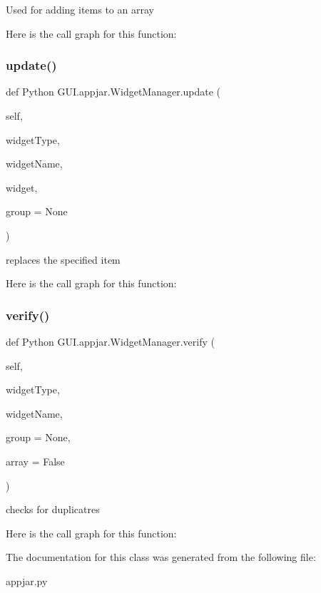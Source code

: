 \begin{DoxyVerb}Used for adding items to an array \end{DoxyVerb}
 Here is the call graph for this function\+:
\mbox{\label{class_python_01_g_u_i_1_1appjar_1_1_widget_manager_acbedce7adb2442054dca32e44533c4c3}} 
\subsubsection{\texorpdfstring{update()}{update()}}
{\footnotesize\ttfamily def Python G\+U\+I.\+appjar.\+Widget\+Manager.\+update (\begin{DoxyParamCaption}\item[{}]{self,  }\item[{}]{widget\+Type,  }\item[{}]{widget\+Name,  }\item[{}]{widget,  }\item[{}]{group = {\ttfamily None} }\end{DoxyParamCaption})}

\begin{DoxyVerb}replaces the specified item \end{DoxyVerb}
 Here is the call graph for this function\+:
\mbox{\label{class_python_01_g_u_i_1_1appjar_1_1_widget_manager_ad1027d466e6e667e6310f13fa73df2c8}} 
\subsubsection{\texorpdfstring{verify()}{verify()}}
{\footnotesize\ttfamily def Python G\+U\+I.\+appjar.\+Widget\+Manager.\+verify (\begin{DoxyParamCaption}\item[{}]{self,  }\item[{}]{widget\+Type,  }\item[{}]{widget\+Name,  }\item[{}]{group = {\ttfamily None},  }\item[{}]{array = {\ttfamily False} }\end{DoxyParamCaption})}

\begin{DoxyVerb}checks for duplicatres \end{DoxyVerb}
 Here is the call graph for this function\+:


The documentation for this class was generated from the following file\+:\begin{DoxyCompactItemize}
\item 
appjar.\+py\end{DoxyCompactItemize}
